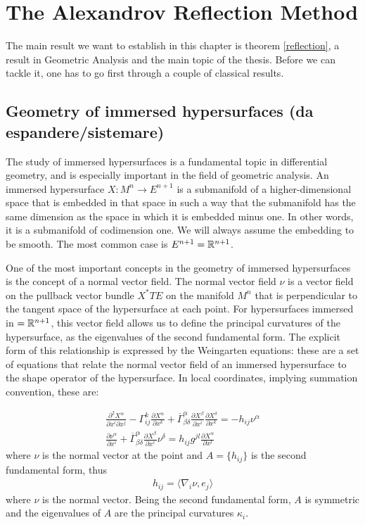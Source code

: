 \chapter{The Alexandrov Reflection Method}

The main result we want to establish in this chapter is theorem \ref{reflection}, a result in Geometric Analysis and the main topic of the thesis. Before we can tackle it, one has to go first through a couple of classical results. 

\section{Geometry of immersed hypersurfaces (da espandere/sistemare)}


The study of immersed hypersurfaces is a fundamental topic in differential geometry, and is especially important in the field of geometric analysis. An immersed hypersurface $X: M^n \rightarrow E^{n+1}$ is a submanifold of a higher-dimensional space that is embedded in that space in such a way that the submanifold has the same dimension as the space in which it is embedded minus one. In other words, it is a submanifold of codimension one. We will always assume the embedding to be smooth. The most common case is $E^{n+1}=\mathbb{R}^{n+1}$. 

One of the most important concepts in the geometry of immersed hypersurfaces is the concept of a normal vector field. The normal vector field $\nu$ is a vector field on the pullback vector bundle $X^* TE$ on the manifold $M^n$ that is perpendicular to the tangent space of the hypersurface at each point. For hypersurfaces immersed in $=\mathbb{R}^{n+1}$, this vector field allows us to define the principal curvatures of the hypersurface, as the eigenvalues of the second fundamental form. The explicit form of this relationship is expressed by the Weingarten equations: these are a set of equations that relate the normal vector field of an immersed hypersurface to the shape operator of the hypersurface. In local coordinates, implying summation convention, these are:

\begin{align}
	\label{Weingarten1} \frac{\partial^2 X^\alpha}{\partial x^i \partial x^j} - \Gamma^k_{ij}\frac{\partial X^\alpha}{\partial x^k}+\overline{\Gamma}^\alpha_{\beta \delta}\frac{\partial X^\beta}{\partial x^i}\frac{\partial X^\delta}{\partial x^k}=-h_{ij}\nu^\alpha \\
	\label{Weingarten2} \frac{\partial \nu^\alpha}{\partial x^i}+\overline{\Gamma}^\alpha_{\beta \delta}\frac{\partial X^\beta}{\partial x^i} \nu^\delta = h_{ij}g^{jl}\frac{\partial X^\alpha}{\partial x^l}
\end{align}
where $\nu$ is the normal vector at the point and $A=\{h_{ij}\}$ is the second fundamental form, thus 
\begin{align}
	h_{ij}=\langle \nabla_i \nu , e_j \rangle
\end{align}
where $ \nu $ is the normal vector. Being the second fundamental form, $A$ is symmetric and the eigenvalues of $A$ are the principal curvatures $\kappa_i$. 

